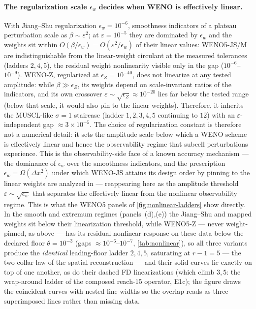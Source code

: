 \documentclass[pdflatex,sn-mathphys-num]{sn-jnl}%
\theoremstyle{thmstyleone}%
\theoremstyle{thmstyletwo}%
\theoremstyle{thmstylethree}%
\begin{document}
\paragraph{The regularization scale \texorpdfstring{$\epsilon_w$}{epsilon\_w} decides when WENO is effectively linear.}
With Jiang--Shu regularization $\epsilon_w=10^{-6}$, smoothness indicators of a plateau perturbation scale as $\beta\sim\varepsilon^2$; at $\varepsilon=10^{-5}$ they are dominated by $\epsilon_w$ and the weights sit within $O(\beta/\epsilon_w)=O(\varepsilon^2/\epsilon_w)$ of their linear values: WENO5-JS/M are indistinguishable from the linear-weight circulant at the measured tolerances (ladders $2,4,5$), the residual weight nonlinearity visible only in the gap ($10^{-6}$--$10^{-9}$).
WENO-Z, regularized at $\epsilon_Z=10^{-40}$, does not linearize at any tested amplitude: while $\beta\gg\epsilon_Z$, its weights depend on scale-invariant ratios of the indicators, and its own crossover $\varepsilon\sim\sqrt{\epsilon_Z}\approx10^{-20}$ lies far below the tested range (below that scale, it would also pin to the linear weights).
Therefore, it inherits the MUSCL-like $\sigma=1$ staircase (ladder $1,2,3,4,5$ continuing to $12$) with an $\varepsilon$-independent gap $\approx3\times10^{-5}$.
The choice of regularization constant is therefore not a numerical detail: it sets the amplitude scale below which a WENO scheme is effectively linear and hence the observability regime that subcell perturbations experience.
This is the observability-side face of a known accuracy mechanism --- the dominance of $\epsilon_w$ over the smoothness indicators, and the prescription $\epsilon_w=\Omega(\Delta x^2)$ under which WENO-JS attains its design order by pinning to the linear weights are analyzed in \cite{ArandigaBaezaBeldaMulet2011} --- reappearing here as the amplitude threshold $\varepsilon\sim\sqrt{\epsilon_w}$ that separates the effectively linear from the nonlinear observability regime.
This is what the WENO5 panels of \cref{fig:nonlinear-ladders} show directly.
In the smooth and extremum regimes (panels~(d),(e)) the Jiang--Shu and mapped weights sit below their linearization threshold, while WENO5-Z --- never weight-pinned, as above --- has its residual nonlinear response on these data below the declared floor $\theta=10^{-3}$ (gaps $\approx10^{-6}$--$10^{-7}$, \cref{tab:nonlinear}), so all three variants produce the \emph{identical} leading-floor ladder $2,4,5$, saturating at $r-1=5$ --- the two-collar law of the spatial reconstruction --- and their solid curves lie exactly on top of one another, as do their dashed FD linearizations (which climb $3,5$: the wrap-around ladder of the composed reach-$15$ operator, E1c); the figure draws the coincident curves with nested line widths so the overlap reads as three superimposed lines rather than missing data.
\end{document}
